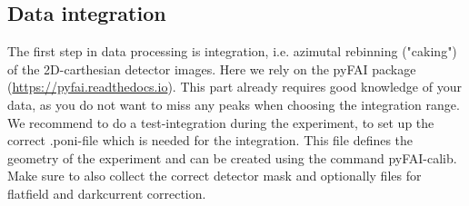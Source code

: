 \subsection{Data integration}\label{sec:integration}
The first step in data processing is integration, i.e. azimutal rebinning ("caking") of the 2D-carthesian detector images.
Here we rely on the pyFAI package (\url{https://pyfai.readthedocs.io}).
This part already requires good knowledge of your data, as you do not want to miss any peaks when choosing the
integration range. We recommend to do a test-integration during the experiment, to set up the correct
.poni-file which is needed for the integration. This file defines the geometry of the experiment and can be
created using the command pyFAI-calib. Make sure to also collect the correct detector mask and optionally files
for flatfield and darkcurrent correction.

